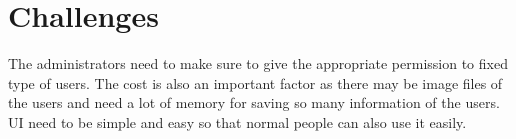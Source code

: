 \documentclass[12pt]{article}
\begin{document}
\section*{Challenges}
The administrators need to make sure to give the appropriate permission to fixed type of users. The cost is also an important factor as there may be image files of the users and need a lot of memory for saving so many information of the users. UI need to be simple and easy so that normal people can also use it easily.
\end{document}
